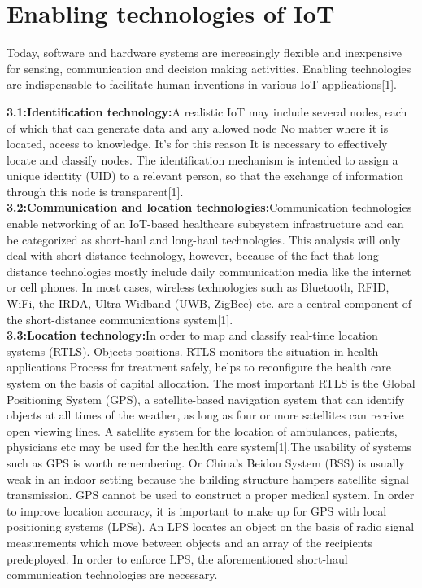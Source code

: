 \documentclass[paper=a4, fontsize=11pt]{scrartcl}
\numberwithin{equation}{section}		%
\numberwithin{figure}{section}			%
\numberwithin{table}{section}				%
\begin{document}
\section{Enabling technologies of IoT}
Today, software and hardware systems are increasingly flexible and inexpensive for sensing, communication and decision making activities. Enabling technologies are indispensable to facilitate human inventions in various IoT applications[1].
\begin{itemize}
     \textbf{3.1:Identification technology:}A realistic IoT may include several nodes, each of which that can generate data and any allowed node No matter where it is located, access to knowledge. It's for this reason It is necessary to effectively locate and classify nodes. The identification mechanism is intended to assign a unique identity (UID) to a relevant person, so that the exchange of information through this node is transparent[1].\\
    \textbf{3.2:Communication and location technologies:}Communication technologies enable networking of an IoT-based healthcare subsystem infrastructure and can be categorized as short-haul and long-haul technologies. This analysis will only deal with short-distance technology, however, because of the fact that long-distance technologies mostly include daily communication media like the internet or cell phones. In most cases, wireless technologies such as Bluetooth, RFID, WiFi, the IRDA, Ultra-Widband (UWB, ZigBee) etc. are a central component of the short-distance communications system[1].\\
    \textbf{3.3:Location technology:}In order to map and classify real-time location systems (RTLS).
Objects positions. RTLS monitors the situation in health applications
Process for treatment safely, helps to reconfigure the health care system on the basis of capital allocation. The most important RTLS is the Global Positioning System (GPS), a satellite-based navigation system that can identify objects at all times of the weather, as long as four or more satellites can receive open viewing lines. A satellite system for the location of ambulances, patients, physicians etc may be used for the health care system[1].The usability of systems such as GPS is worth remembering.
Or China's Beidou System (BSS) is usually weak in an indoor setting because the building structure hampers satellite signal transmission. GPS cannot be used to construct a proper medical system. In order to improve location accuracy, it is important to make up for GPS with local positioning systems (LPSs). An LPS locates an object on the basis of radio signal measurements which move between objects and an array of the recipients predeployed. In order to enforce LPS, the aforementioned short-haul communication technologies are necessary.\\

\end{itemize}
\end{document}
